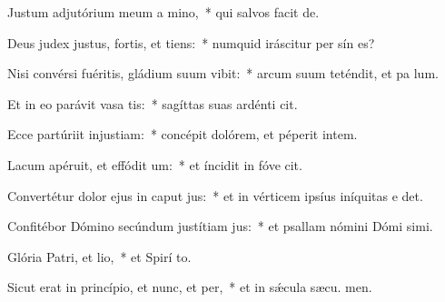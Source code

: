 \item Justum adjutórium meum a mino,~* qui salvos facit  de.
\item Deus judex justus, fortis, et tiens:~* numquid iráscitur per sín es?
\item Nisi convérsi fuéritis, gládium suum vibit:~* arcum suum teténdit, et pa lum.
\item Et in eo parávit vasa tis:~* sagíttas suas ardénti cit.
\item Ecce partúriit injustiam:~* concépit dolórem, et péperit intem.
\item Lacum apéruit, et effódit um:~* et íncidit in fóve  cit.
\item Convertétur dolor ejus in caput jus:~* et in vérticem ipsíus iníquitas e det.
\item Confitébor Dómino secúndum justítiam jus:~* et psallam nómini Dómi simi.
\item Glória Patri, et lio,~* et Spirí to.
\item Sicut erat in princípio, et nunc, et per,~* et in sǽcula sæcu. men.

